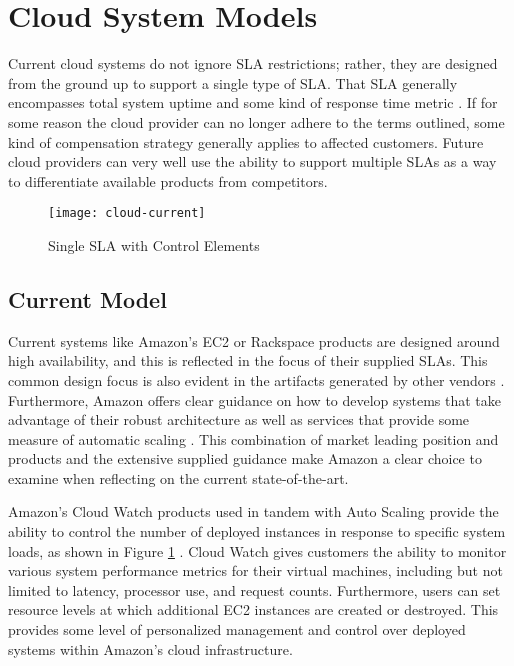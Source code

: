 \section{Cloud System Models}\label{sec:cloud-models}
\noindent Current cloud systems do not ignore SLA restrictions; rather, they are designed from the ground up to support a single type of SLA.  That SLA generally encompasses total system uptime and some kind of response time metric \cite{ctrl:amazon-sla,ctrl:rackspace-sla}.  If for some reason the cloud provider can no longer adhere to the terms outlined, some kind of compensation strategy generally applies to affected customers.  Future cloud providers can very well use the ability to support multiple SLAs as a way to differentiate available products from competitors.

\begin{figure}[!t]
\centering
\texttt{[image: cloud-current]}
\caption{Single SLA with Control Elements}
\label{fig:current-cloud-model}
\end{figure}

\subsection{Current Model}
Current systems like Amazon's EC2 or Rackspace products are designed around high availability, and this is reflected in the focus of their supplied SLAs.  This common design focus is also evident in the artifacts generated by other vendors \cite{ctrl:google-arch}.  Furthermore, Amazon offers clear guidance on how to develop systems that take advantage of their robust architecture as well as services that provide some measure of automatic scaling \cite{ctrl:amazon-best-practice,ctrl:amazon-fault-tolerant}.  This combination of market leading position and products and the extensive supplied guidance make Amazon a clear choice to examine when reflecting on the current state-of-the-art.

Amazon's Cloud Watch products used in tandem with Auto Scaling provide the ability to control the number of deployed instances in response to specific system loads, as shown in Figure \ref{fig:current-cloud-model} \cite{ctrl:amazon-cloud-watch,ctrl:amazon-auto-scale}.  Cloud Watch gives customers the ability to monitor various system performance metrics for their virtual machines, including but not limited to latency, processor use, and request counts.  Furthermore, users can set resource levels at which additional EC2 instances are created or destroyed.  This provides some level of personalized management and control over deployed systems within Amazon's cloud infrastructure.

